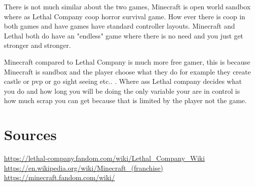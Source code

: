 \documentclass{article}
\begin{document}
There is not much similar about the two games, Minecraft is open world sandbox where as Lethal Company coop horror survival game. How ever there is coop in both games and have games have standard controller layouts. Minecraft and Lethal both do have an "endless" game where there is no need and you just get stronger and stronger.

Minecraft compared to Lethal Company is much more free gamer, this is because Minecraft is sandbox and the player choose what they do for example they create castle or pvp or go sight seeing etc.. . Where ass Lethal company decides what you do and how long you will be doing the only variable your are in control is how much scrap you can get because that is limited by the player not the game.





\break
\section{Sources}
\url{https://lethal-company.fandom.com/wiki/Lethal_Company_Wiki} \\
\url{https://en.wikipedia.org/wiki/Minecraft_(franchise)} \\
\url{https://minecraft.fandom.com/wiki/}
\end{document}
